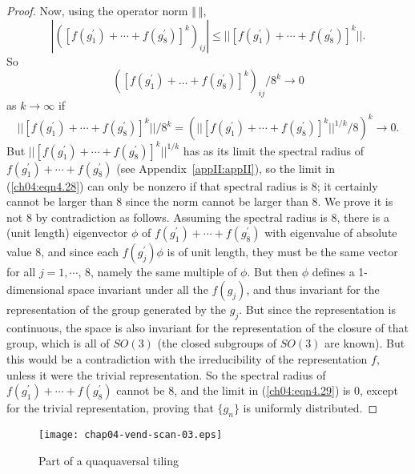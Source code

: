 \documentclass[reqno]{stml-l}
\theoremstyle{plain}
\theoremstyle{definition}
\numberwithin{equation}{chapter}
\begin{document}
\begin{proof}
Now, using the operator norm $\Vert\ \Vert$,
\setcounter{equation}{26}
\begin{equation} \label{ch04:eqn4.27}
|([f(g_{1}^{\prime})+\cdots+f(g^{\prime}_{8})]^{k})_{ij}|\leq||[f(g_{1}^{\prime})+\cdots+f(g^{\prime}_{8})]^{k}||. \end{equation}
So
\begin{equation} \label{ch04:eqn4.28}
([f(g_{1}^{\prime})+\ldots+f(g_{8}^{\prime})]^{k})_{ij}/8^{k}\longrightarrow0
\end{equation}
as $k\rightarrow\infty$ if
\begin{equation}\label{ch04:eqn4.29}
||[f(g_{1}^{\prime})+\cdots+f(g_{8}^{\prime})]^{k}||/8^{k}=(||[f(g_{1}^{\prime})+\cdots+f(g_{8}^{\prime})]^{k}||^{1/k}/8)^{k}\longrightarrow0. \end{equation}
But $||[f(g_{1}^{\prime})+\cdots+f(g_{8}^{\prime})]^{k}||^{1/k}$ has as its limit the spectral radius of $f(g_{1}^{\prime})+\cdots+f(g_{8}^{\prime})$ (see Appendix~\ref{appII:appII}), so the limit in (\ref{ch04:eqn4.28}) can only be nonzero if that spectral radius is 8; it certainly cannot be larger than 8 since the norm cannot be larger than 8. We prove it is not 8 by contradiction as follows. Assuming the spectral radius is 8, there is a (unit length) eigenvector $\phi$ of $f(g_{1}^{\prime})+\cdots+f(g_{8}^{\prime})$ with eigenvalue of absolute value 8, and since each $f(g_{j}^{\prime})\phi$ is of unit length, they must be the same vector for all $j=1,\cdots$, 8, namely the same multiple of $\phi$. But then $\phi$ defines a 1-dimensional space invariant under all the $f(g_{j})$, and thus invariant for the representation of the group generated by the $g_{j}$. But since the representation is continuous, the space is also invariant for the representation of the closure of that group, which is all of $SO(3)$ (the closed subgroups of $SO(3)$ are known). But this would be a contradiction with the irreducibility of the representation $f$, unless it were the trivial representation. So the spectral radius of $f(g_{1}^{\prime})+\cdots+f(g_{8}^{\prime})$ cannot be 8, and the limit in (\ref{ch04:eqn4.29}) is $0$, except for the trivial representation, proving that $\{g_{n}\}$ is uniformly distributed.
\end{proof}

\begin{figure}[h]
\texttt{[image: chap04-vend-scan-03.eps]}
\caption{Part of a quaquaversal tiling}
\label{ch04:fig32}
\end{figure}
\end{document}
